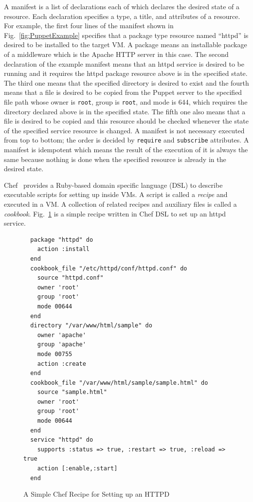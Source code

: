\documentclass[12pt]{report}
\begin{document}
A manifest is a list of declarations each of which declares the
desired state of a resource. Each declaration specifies a type, a
title, and attributes of a resource. For example, the first four lines
of the manifest shown in Fig.~\ref{fig:PuppetExample} specifies that a
package type resource named ``httpd'' is desired to be installed to
the target VM. A package means an installable package of a middleware
which is the Apache HTTP server in this case.  The second declaration
of the example manifest means that an httpd service is desired to be
running and it requires the httpd package resource above is
in the specified state. The third one means that the specified
directory is desired to exist and the fourth means that a file is
desired to be copied from the Puppet server to the specified file path
whose owner is {\tt root}, group is {\tt root}, and mode is 644, which
requires the directory declared above is in the specified state.  The
fifth one also means that a file is desired to be copied and this
resource should be checked whenever the state of the specified service
resource is changed. A manifest is not necessary executed from top to
bottom; the order is decided by {\tt require} and {\tt subscribe}
attributes. A manifest is idempotent which means the result of the
execution of it is always the same because nothing is done when the
specified resource is already in the desired state.

Chef~\cite{Chef} provides a Ruby-based domain specific language (DSL)
to describe executable scripts for setting up inside VMs. A script is
called a {\it recipe} and executed in a VM. A collection of related
recipes and auxiliary files is called a {\it cookbook}.
Fig.~\ref{fig:ChefExample} is a simple recipe written in Chef DSL to
set up an httpd service.
\begin{figure}
\small
\begin{verbatim}
  package "httpd" do
    action :install
  end
  cookbook_file "/etc/httpd/conf/httpd.conf" do
    source "httpd.conf"
    owner 'root'
    group 'root'
    mode 00644
  end
  directory "/var/www/html/sample" do
    owner 'apache'
    group 'apache'
    mode 00755
    action :create
  end
  cookbook_file "/var/www/html/sample/sample.html" do
    source "sample.html"
    owner 'root'
    group 'root'
    mode 00644
  end
  service "httpd" do
    supports :status => true, :restart => true, :reload => true
    action [:enable,:start]
  end
\end{verbatim}
\normalsize
\vspace{-0.6cm}
\caption{A Simple Chef Recipe for Setting up an HTTPD}
\label{fig:ChefExample}
\end{figure}
\end{document}
